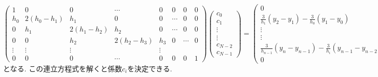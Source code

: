 \begin{equation}
    \begin{pmatrix}
        1 & 0 &  0 & \cdots & 0 & 0 & 0 & 0\\
        h_{0} & 2(h_{0} - h_{1}) & h_{1} & 0 & 0& \cdots & 0 & 0\\
        0 & h_{1} & 2(h_{1} - h_{2}) & h_{2} & 0 & \cdots &  0 & 0\\
        0 & 0 & h_{2} & 2(h_{2} - h_{3}) & h_{3} & 0 & \cdots & 0 \\
        \vdots & \vdots & \vdots & &  \vdots \\
        0 & 0 &  0 & \cdots & 0 & 0 & 0 & 1
    \end{pmatrix}
    \begin{pmatrix}
        c_{0} \\ c_{1} \\ \vdots \\ \vdots \\ c_{N-2} \\ c_{N-1}
    \end{pmatrix}
    =
    \begin{pmatrix}
        0 \\
        \frac{3}{h_{1}}(y_{2} - y_{1}) - \frac{3}{h_{0}}(y_{1} - y_{0}) \\
        \vdots \\
        \vdots \\
        \frac{3}{h_{n-1}}(y_{n} - y_{n-1}) - \frac{3}{h_{i}}(y_{n-1} - y_{n-2}) \\
        0
    \end{pmatrix}
\end{equation}
となる. この連立方程式を解くと係数$c_{i}$を決定できる.

\clearpage
%
%

